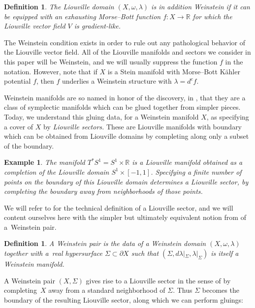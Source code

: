 \documentclass[pdftex]{sigma}%
\numberwithin{equation}{section}
\newtheorem{Definition}[Theorem]{Definition}
\newtheorem{Example}[Theorem]{Example}
\def\RR{\mathbb{R}}
\begin{document}
 \begin{Definition}
 The Liouville domain $(X,\omega,\lambda)$ is in addition {\em Weinstein} if it can be equipped with an exhausting Morse--Bott function $f\colon X\to \RR$ for which the Liouville vector field $V$ is gradient-like.
\end{Definition}
The Weinstein condition exists in order to rule out any pathological behavior of the Liouville vector field. All of the Liouville manifolds and sectors we consider in this paper will be Weinstein, and we will usually suppress the function $f$ in the notation. However, note that if $X$ is a Stein manifold with Morse--Bott K\"ahler potential $f$, then $f$ underlies a Weinstein structure with $\lambda = d^cf$.

Weinstein manifolds are so named in honor of the discovery, in \cite{Weinstein}, that they are a class of symplectic manifolds which can be glued together from simpler pieces. Today, we understand this gluing data, for a Weinstein manifold $X$, as specifying a cover of $X$ by {\em Liouville sectors.} These are Liouville manifolds with boundary which can be obtained from Liouville domains by completing along only a subset of the boundary.

\begin{Example}
	The manifold $T^*S^1=S^1\times \RR$ is a Liouville manifold obtained as a completion of the Liouville domain $S^1\times [-1,1]$. Specifying a finite number of points on the boundary of this Liouville domain determines a Liouville sector, by completing the boundary away from neighborhoods of those points.
\end{Example}

We will refer to \cite[Definition 1.1]{GPS1} for the technical definition of a Liouville sector, and we will content ourselves here with the simpler but ultimately equivalent notion from \cite{Eliashberg-revisited} of a~Weinstein pair.

\begin{Definition}
 A {\em Weinstein pair} is the data of a Weinstein domain $(X,\omega,\lambda)$ together with a~real hypersurface $\Sigma\subset \partial X$ such that $(\Sigma,d\lambda|_\Sigma,\lambda|_\Sigma)$ is itself a Weinstein manifold.
\end{Definition}

A Weinstein pair $(X,\Sigma)$ gives rise to a Liouville sector in the sense of \cite{GPS1} by completing~$X$ away from a standard neighborhood of $\Sigma$. Thus $\Sigma$ becomes the boundary of the resulting Liouville sector, along which we can perform gluings:
\end{document}
